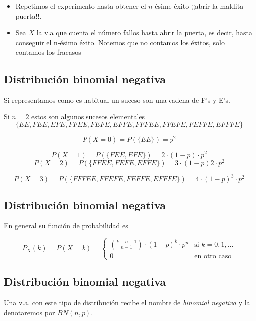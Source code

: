 \documentclass[]{book}
\providecommand{\tightlist}{%
  \setlength{\itemsep}{0pt}\setlength{\parskip}{0pt}}
\begin{document}
\begin{itemize}
\tightlist
\item
  Repetimos el experimento hasta obtener el \(n\)-ésimo éxito ¡¡abrir la maldita puerta!!.
\item
  Sea \(X\) la v.a que cuenta el número fallos hasta abrir la puerta, es decir, hasta conseguir el n-ésimo éxito. Notemos que no contamos los éxitos, solo contamos los fracasos
\end{itemize}

\hypertarget{distribuciuxf3n-binomial-negativa-2}{%
\subsection{Distribución binomial negativa}\label{distribuciuxf3n-binomial-negativa-2}}

Si representamos como es habitual un suceso son una cadena de F's y E's.

Si \(n=2\) estos son algunos sucesos elementales
\[\{EE,FEE,EFE, FFEE,FEFE,EFFE,FFFEE,FFEFE,FEFFE,EFFFE\}\]

\[P(X=0)=P(\{EE\})=p^2\]

\[P(X=1)=P(\{FEE,EFE\})=2\cdot (1-p)\cdot p^2\]
\[P(X=2)=P(\{FFEE,FEFE,EFFE\})=3\cdot (1-p) 2\cdot p^2\]

\[P(X=3)=P(\{FFFEE,FFEFE,FEFFE,EFFFE\})=4\cdot (1-p)^3\cdot p^2\]

\hypertarget{distribuciuxf3n-binomial-negativa-3}{%
\subsection{Distribución binomial negativa}\label{distribuciuxf3n-binomial-negativa-3}}

En general su función de probabilidad es

\[
P_{X}(k)=P(X=k)=\left\{\begin{array}{ll}
     {{k+n-1}\choose{n-1}} \cdot (1-p)^{k}\cdot p^n & \mbox{si } k=0,1,\ldots\\
     0 & \mbox{en otro caso}\end{array}\right.
\]

\hypertarget{distribuciuxf3n-binomial-negativa-4}{%
\subsection{Distribución binomial negativa}\label{distribuciuxf3n-binomial-negativa-4}}

Una v.a. con este tipo de distribución recibe el nombre de \emph{binomial negativa} y la denotaremos por \(BN(n,p)\).
\end{document}
